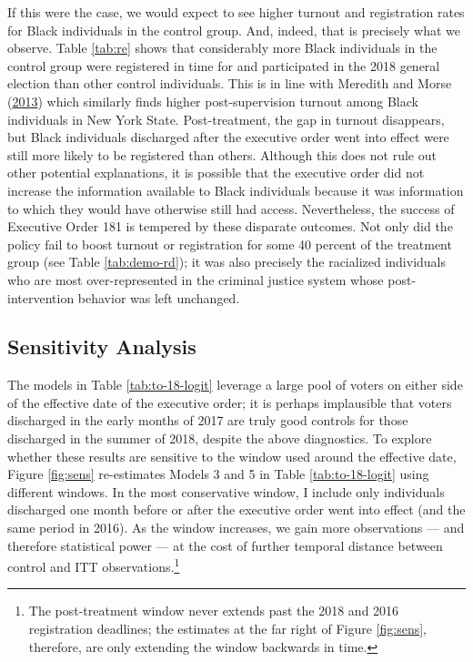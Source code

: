 \documentclass[
  12pt,
]{article}
\begin{document}
If this were the case, we would expect to see higher turnout and registration rates for Black individuals in the control group. And, indeed, that is precisely what we observe. Table \ref{tab:re} shows that considerably more Black individuals in the control group were registered in time for and participated in the 2018 general election than other control individuals. This is in line with Meredith and Morse (\protect\hyperlink{ref-Meredith2013}{2013}) which similarly finds higher post-supervision turnout among Black individuals in New York State. Post-treatment, the gap in turnout disappears, but Black individuals discharged after the executive order went into effect were still more likely to be registered than others. Although this does not rule out other potential explanations, it is possible that the executive order did not increase the information available to Black individuals because it was information to which they would have otherwise still had access. Nevertheless, the success of Executive Order 181 is tempered by these disparate outcomes. Not only did the policy fail to boost turnout or registration for some 40 percent of the treatment group (see Table \ref{tab:demo-rd}); it was also precisely the racialized individuals who are most over-represented in the criminal justice system whose post-intervention behavior was left unchanged.

\begin{singlespace}


\end{singlespace}

\hypertarget{sensitivity-analysis}{%
\subsection*{Sensitivity Analysis}\label{sensitivity-analysis}}

The models in Table \ref{tab:to-18-logit} leverage a large pool of voters on either side of the effective date of the executive order; it is perhaps implausible that voters discharged in the early months of 2017 are truly good controls for those discharged in the summer of 2018, despite the above diagnostics. To explore whether these results are sensitive to the window used around the effective date, Figure \ref{fig:sens} re-estimates Models 3 and 5 in Table \ref{tab:to-18-logit} using different windows. In the most conservative window, I include only individuals discharged one month before or after the executive order went into effect (and the same period in 2016). As the window increases, we gain more observations --- and therefore statistical power --- at the cost of further temporal distance between control and ITT observations.\footnote{The post-treatment window never extends past the 2018 and 2016 registration deadlines; the estimates at the far right of Figure \ref{fig:sens}, therefore, are only extending the window backwards in time.}
\end{document}
